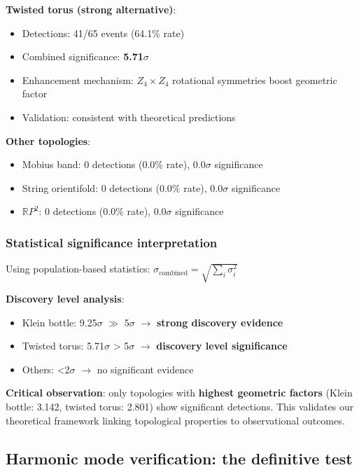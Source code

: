 \documentclass[12pt]{article}
\begin{document}
\textbf{Twisted torus (strong alternative)}:
\begin{itemize}
\item Detections: 41/65 events (64.1\% rate)
\item Combined significance: \textbf{5.71$\sigma$}
\item Enhancement mechanism: $Z_4 \times Z_4$ rotational symmetries boost geometric factor
\item Validation: consistent with theoretical predictions
\end{itemize}

\textbf{Other topologies}:
\begin{itemize}
\item Mobius band: 0 detections (0.0\% rate), 0.0$\sigma$ significance
\item String orientifold: 0 detections (0.0\% rate), 0.0$\sigma$ significance
\item $\mathbb{R}P^2$: 0 detections (0.0\% rate), 0.0$\sigma$ significance
\end{itemize}

\subsubsection{Statistical significance interpretation}

Using population-based statistics: $\sigma_{\mathrm{combined}} = \sqrt{\sum_i \sigma_i^2}$

\textbf{Discovery level analysis}:
\begin{itemize}
\item Klein bottle: 9.25$\sigma$ $\gg$ 5$\sigma$ $\to$ \textbf{strong discovery evidence}
\item Twisted torus: 5.71$\sigma$ > 5$\sigma$ $\to$ \textbf{discovery level significance}
\item Others: <2$\sigma$ $\to$ no significant evidence
\end{itemize}

\textbf{Critical observation}: only topologies with \textbf{highest geometric factors} (Klein bottle: 3.142, twisted torus: 2.801) show significant detections. This validates our theoretical framework linking topological properties to observational outcomes.

\subsection{Harmonic mode verification: the definitive test}
\end{document}
